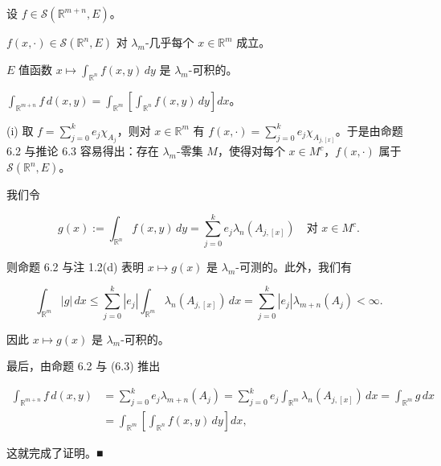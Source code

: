 \begin{lemma}

设 $ f \in \mathcal{S}(\mathbb{R}^{m+n}, E) $。

\begin{subitems}
\item

$ f(x, \cdot) \in \mathcal{S}(\mathbb{R}^n, E) $ 对 $ \lambda_m $-几乎每个 $ x \in \mathbb{R}^m $ 成立。

\item

$ E $ 值函数 $ x \mapsto \int_{\mathbb{R}^n} f(x, y) \, dy $ 是 $ \lambda_m $-可积的。

\item

$ \int_{\mathbb{R}^{m+n}} f \, d(x, y) = \int_{\mathbb{R}^m} \left[ \int_{\mathbb{R}^n} f(x, y) \, dy \right] dx $。

\proofhead
(i) 取 $ f = \sum_{j=0}^{k} e_j \chi_{A_j} $，则对 $ x \in \mathbb{R}^m $ 有 $ f(x, \cdot) = \sum_{j=0}^{k} e_j \chi_{A_{j,[x]}} $。于是由命题 6.2 与推论 6.3 容易得出：存在 $ \lambda_m $-零集 $ M $，使得对每个 $ x \in M^{c} $，$ f(x, \cdot) $ 属于 $ \mathcal{S}(\mathbb{R}^n, E) $。
\end{subitems}

\begin{subitems}
\item[（ii）]

我们令

\begin{equation}
g(x) := \int_{\mathbb{R}^n} f(x, y) \, dy = \sum_{j=0}^{k} e_j \lambda_n(A_{j,[x]}) \quad \text{对 } x \in M^{c} .\tag{6.3}
\end{equation}

则命题 6.2 与注 1.2(d) 表明 $ x \mapsto g(x) $ 是 $ \lambda_m $-可测的。此外，我们有

\[
\int_{\mathbb{R}^m} |g| \, dx \le \sum_{j=0}^{k} |e_j| \int_{\mathbb{R}^m} \lambda_n(A_{j,[x]}) \, dx = \sum_{j=0}^{k} |e_j| \lambda_{m+n}(A_j) < \infty .
\]

因此 $ x \mapsto g(x) $ 是 $ \lambda_m $-可积的。

\item[（iii）]

最后，由命题 6.2 与 (6.3) 推出

\begin{equation*}
\begin{aligned}
\int_{\mathbb{R}^{m+n}} f \, d(x, y) &= \sum_{j=0}^{k} e_j \lambda_{m+n}(A_j) = \sum_{j=0}^{k} e_j \int_{\mathbb{R}^m} \lambda_n(A_{j,[x]}) \, dx = \int_{\mathbb{R}^m} g \, dx \\ &= \int_{\mathbb{R}^m} \left[ \int_{\mathbb{R}^n} f(x, y) \, dy \right] dx ,
\end{aligned}
\end{equation*}

这就完成了证明。\nobreak\hspace{0.35em}■

\end{subitems}

\end{lemma}

